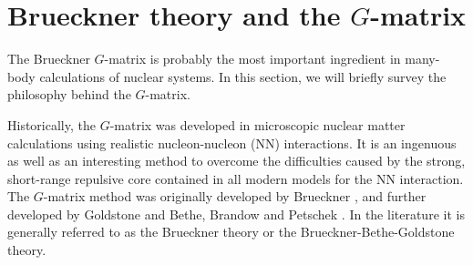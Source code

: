 
\section{Brueckner theory and the $G$-matrix}
The Brueckner $G$-matrix is probably the most important ingredient
in many-body calculations of nuclear systems. In this section, we will
briefly survey the philosophy behind the $G$-matrix.

Historically, the $G$-matrix was developed in microscopic nuclear
matter calculations using realistic nucleon-nucleon (NN) interactions.
It is an ingenuous as well as an interesting method to overcome the
difficulties caused by the strong, short-range repulsive core contained
in all modern models for the NN interaction. The $G$-matrix method was
originally developed by Brueckner \cite{bruck57}, and further
developed by Goldstone \cite{gold58} and Bethe, Brandow and Petschek
\cite{bbp63}. In the literature it is generally referred to as the
Brueckner theory or the Brueckner-Bethe-Goldstone theory.


